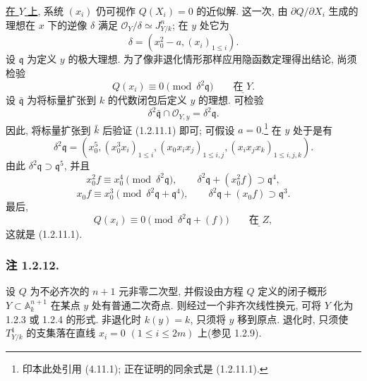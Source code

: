 \underline{在 $Y$ 上}, 系统 $(x_i)$ 仍可视作 $Q(X_i)=0$ 的近似解. 这一次, 由 $\partial Q/\partial X_i$ 生成的理想在 $x$ 下的逆像 $\delta$ 满足 $\mathcal O_Y/\delta\simeq J^n_{Y/k}$; 在 $y$ 处它为
\[
\delta=(x_0^2-a,(x_i)_{1\leq i}).
\]
设 $\mathfrak q$ 为定义 $y$ 的极大理想. 为了像非退化情形那样应用隐函数定理得出结论, 尚须检验
\begin{equation}\tag{1.2.11.1}
Q(x_i)\equiv0\pmod{\delta^2\mathfrak q}
\qquad\underline{\text{在 }Y}.
\end{equation}
设 $\bar{\mathfrak q}$ 为将标量扩张到 $k$ 的代数闭包后定义 $y$ 的理想. 可检验
\[
\delta^2\bar{\mathfrak q}\cap\mathcal O_{Y,y}
=\delta^2\mathfrak q.
\]
因此, 将标量扩张到 $\bar k$ 后验证 (1.2.11.1) 即可; 可假设 $a=0$.\footnote{印本此处引用 (4.11.1); 正在证明的同余式是 (1.2.11.1).}
在 $y$ 处于是有
\[
\delta^2\mathfrak q=
(x_0^5,(x_0^3x_i)_{1\leq i},
 (x_0x_ix_j)_{1\leq i,j},
 (x_ix_jx_k)_{1\leq i,j,k}).
\]
由此 $\delta^2\mathfrak q\supset\mathfrak q^5$, 并且
\[
x_0^2f\equiv x_0^4\pmod{\delta^2\mathfrak q},
\qquad
\delta^2\mathfrak q+(x_0^2f)\supset\mathfrak q^4,
\]
\[
x_0f\equiv x_0^3
 \pmod{\delta^2\mathfrak q+\mathfrak q^4},
\qquad
\delta^2\mathfrak q+(x_0f)\supset\mathfrak q^3.
\]
最后,
\[
Q(x_i)\equiv0\pmod{\delta^2\mathfrak q+(f)}
\qquad\underline{\text{在 }Z},
\]
这就是 (1.2.11.1).

\subsubsection*{注 1.2.12.}
设 $Q$ 为不必齐次的 $n+1$ 元非零二次型, 并假设由方程 $Q$ 定义的闭子概形 $Y\subset\mathbb A_k^{n+1}$ 在某点 $y$ 处有普通二次奇点. 则经过一个非齐次线性换元, 可将 $Y$ 化为 1.2.3 或 1.2.4 的形式. 非退化时 $k(y)=k$, 只须将 $y$ 移到原点. 退化时, 只须使 $T^1_{Y/k}$ 的支集落在直线 $x_i=0$ $(1\leq i\leq2m)$ 上(参见 1.2.9).